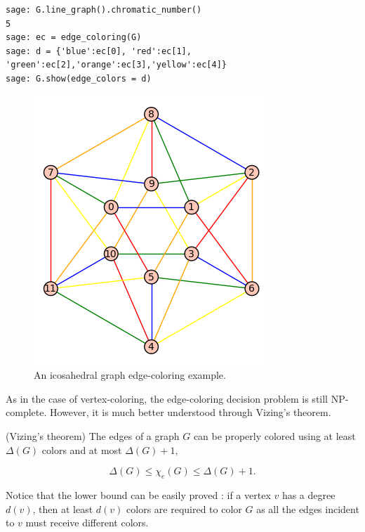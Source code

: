 \begin{example}
\begin{lstlisting}
sage: G.line_graph().chromatic_number()
5
sage: ec = edge_coloring(G)
sage: d = {'blue':ec[0], 'red':ec[1], 'green':ec[2],'orange':ec[3],'yellow':ec[4]}
sage: G.show(edge_colors = d)
\end{lstlisting}


\begin{figure}[!htbp]
\centering
{}
\includegraphics[scale=0.7]{image/graph-coloring/icosahedral-graph-edge-coloring-example}
\caption{An icosahedral graph edge-coloring example.}
\label{fig:graph-coloring:icosahedral-graph-edge-coloring-example}
\end{figure}

\end{example}


As in the case of vertex-coloring, the edge-coloring decision problem is 
still NP-complete. However, it is much better understood through 
Vizing's theorem.

\begin{theorem}
(Vizing's theorem)
The edges of a graph $G$ can be properly colored using at least 
$\Delta(G)$ colors and at most $\Delta(G)+1$,

\[
\Delta(G)\leq \chi_e(G)\leq \Delta(G)+1.
\]
\end{theorem}

Notice that the lower bound can be easily proved : if a vertex 
$v$ has a degree $d(v)$, then at least $d(v)$ colors are required 
to color $G$ as all the edges incident to $v$ must receive 
different colors. 

